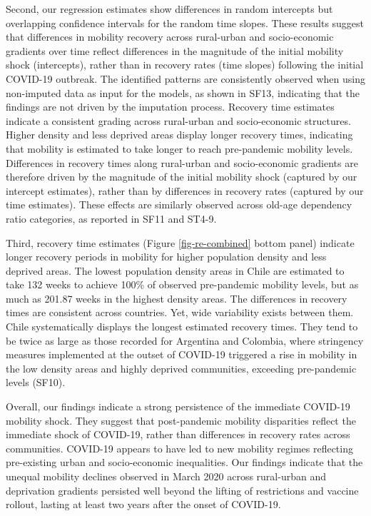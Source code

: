 \documentclass[fleqn,10pt]{wlscirep}
\begin{document}
Second, our regression estimates show differences in random intercepts but overlapping confidence intervals for the random time slopes. These results suggest that differences in mobility recovery across rural-urban and socio-economic gradients over time reflect differences in the magnitude of the initial mobility shock (intercepts), rather than in recovery rates (time slopes) following the initial COVID-19 outbreak. The identified patterns are consistently observed when using non-imputed data as input for the models, as shown in SF13, indicating that the findings are not driven by the imputation process. Recovery time estimates indicate a consistent grading across rural-urban and socio-economic structures. Higher density and less deprived areas display longer recovery times, indicating that mobility is estimated to take longer to reach pre-pandemic mobility levels. Differences in recovery times along rural-urban and socio-economic gradients are therefore driven by the magnitude of the initial mobility shock (captured by our intercept estimates), rather than by differences in recovery rates (captured by our time estimates). These effects are similarly observed across old-age dependency ratio categories, as reported in SF11 and ST4-9.

Third, recovery time estimates (Figure \ref{fig-re-combined} bottom panel) indicate longer recovery periods in mobility for higher population density and less deprived areas. The lowest population density areas in Chile are estimated to take 132 weeks to achieve 100\% of observed pre-pandemic mobility levels, but as much as 201.87 weeks in the highest density areas. The differences in recovery times are consistent across countries. Yet, wide variability exists between them. Chile systematically displays the longest estimated recovery times. They tend to be twice as large as those recorded for Argentina and Colombia, where stringency measures implemented at the outset of COVID-19 triggered a rise in mobility in the low density areas and highly deprived communities, exceeding pre-pandemic levels (SF10).

Overall, our findings indicate a strong persistence of the immediate COVID-19 mobility shock. They suggest that post-pandemic mobility disparities reflect the immediate shock of COVID-19, rather than differences in recovery rates across communities. COVID-19 appears to have led to new mobility regimes reflecting pre-existing urban and socio-economic inequalities. Our findings indicate that the unequal mobility declines observed in March 2020 across rural-urban and deprivation gradients persisted well beyond the lifting of restrictions and vaccine rollout, lasting at least two years after the onset of COVID-19.
\end{document}

